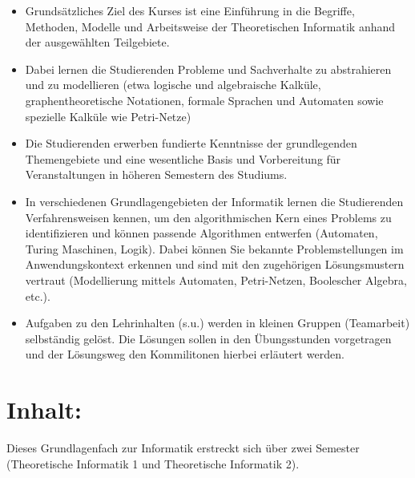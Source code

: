 \begin{itemize}
\tightlist
\item
  Grundsätzliches Ziel des Kurses ist eine Einführung in die Begriffe,
  Methoden, Modelle und Arbeitsweise der Theoretischen Informatik anhand
  der ausgewählten Teilgebiete.
\item
  Dabei lernen die Studierenden Probleme und Sachverhalte zu
  abstrahieren und zu modellieren (etwa logische und algebraische
  Kalküle, graphentheoretische Notationen, formale Sprachen und
  Automaten sowie spezielle Kalküle wie Petri-Netze)
\item
  Die Studierenden erwerben fundierte Kenntnisse der grundlegenden
  Themengebiete und eine wesentliche Basis und Vorbereitung für
  Veranstaltungen in höheren Semestern des Studiums.
\item
  In verschiedenen Grundlagengebieten der Informatik lernen die
  Studierenden Verfahrensweisen kennen, um den algorithmischen Kern
  eines Problems zu identifizieren und können passende Algorithmen
  entwerfen (Automaten, Turing Maschinen, Logik). Dabei können Sie
  bekannte Problemstellungen im Anwendungskontext erkennen und sind mit
  den zugehörigen Lösungsmustern vertraut (Modellierung mittels
  Automaten, Petri-Netzen, Boolescher Algebra, etc.).
\item
  Aufgaben zu den Lehrinhalten (s.u.) werden in kleinen Gruppen
  (Teamarbeit) selbständig gelöst. Die Lösungen sollen in den
  Übungsstunden vorgetragen und der Lösungsweg den Kommilitonen hierbei
  erläutert werden.
\end{itemize}

\section*{Inhalt:}\label{inhalt-24}

Dieses Grundlagenfach zur Informatik erstreckt sich über zwei Semester
(Theoretische Informatik 1 und Theoretische Informatik 2).

